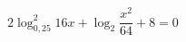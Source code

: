 \begin{ex}[type=equation]
	\begin{condition}
		$2\log_{0,25}^2 16x +\log_2 {\dfrac{x^2}{64}} + 8 = 0$
	\end{condition}
\end{ex}